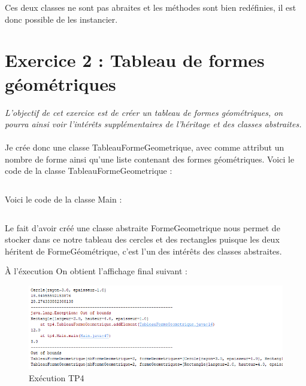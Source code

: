 \inputminted[linenos,firstline=3,lastline=38]{java}{../sources/src/tp4/Rectangle.java}

Ces deux classes ne sont pas abraites et les méthodes sont bien redéfinies, il est donc possible de les instancier.

\section{Exercice 2 : Tableau de formes géométriques}
\textit{L'objectif de cet exercice est de créer un tableau de formes géométriques, on pourra ainsi voir l'intérêts supplémentaires de l'héritage et des classes abstraites.}
\\\\
Je crée donc une classe TableauFormeGeometrique, avec comme attribut un nombre de forme ainsi qu'une liste contenant des formes géométriques.
Voici le code de la classe TableauFormeGeometrique :
\inputminted[linenos,firstline=6,lastline=36]{java}{../sources/src/tp4/TableauFormeGeometrique.java}

Voici le code de la classe Main :
\inputminted[linenos,firstline=3,lastline=38]{java}{../sources/src/tp4/Main.java}

Le fait d’avoir créé une classe abstraite FormeGeometrique nous permet de stocker dans ce notre tableau des cercles et des rectangles puisque les deux héritent de FormeGéométrique, c’est l’un des intérêts des classes abstraites.

À l'éxecution On obtient l’affichage final suivant :
\begin{figure}[H]
  \centering
  \includegraphics[width=500pt]{./tp/Pictures/tp4-execute}
  \caption{Exécution TP4}
  \label{Exécution TP4}
\end{figure}
